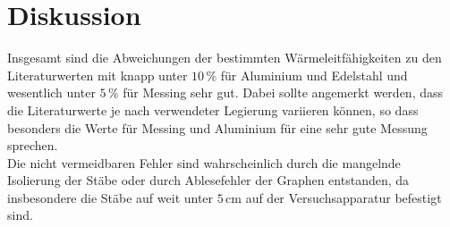 \section{Diskussion}
\label{sec:Diskussion}

Insgesamt sind die Abweichungen der bestimmten Wärmeleitfähigkeiten zu den Literaturwerten mit knapp unter $10\,\%$ für Aluminium
und Edelstahl und wesentlich unter $5\,\%$ für Messing sehr gut. Dabei sollte angemerkt werden, dass die Literaturwerte je nach verwendeter
Legierung variieren können, so dass besonders die Werte für Messing und Aluminium für eine sehr gute Messung sprechen. \\
Die nicht vermeidbaren Fehler sind wahrscheinlich durch die mangelnde Isolierung der Stäbe oder durch Ablesefehler der Graphen entstanden, 
da insbesondere die Stäbe auf weit unter $5\,\si{\centi\meter}$ auf der Versuchsapparatur befestigt sind.